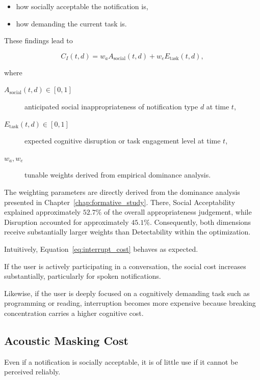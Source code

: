 \begin{itemize}
\item how socially acceptable the notification is,
\item how demanding the current task is.
\end{itemize}

These findings lead to

\begin{equation}
C_I(t,d)
=
w_aA_{\mathrm{social}}(t,d)
+
w_eE_{\mathrm{task}}(t,d),
\label{eq:interrupt_cost}
\end{equation}

where

\begin{description}
\item[{$A_{\mathrm{social}}(t,d) \in [0, 1]$}] anticipated social inappropriateness of notification type $d$ at time $t$,
\item[{$E_{\mathrm{task}}(t,d) \in [0, 1]$}] expected cognitive disruption or task engagement level at time $t$,
\item[$w_a, w_e$] tunable weights derived from empirical dominance analysis.
\end{description}

The weighting parameters are directly derived from the dominance analysis presented in Chapter~\ref{chap:formative_study}. There, Social Acceptability explained approximately $52.7\%$ of the overall appropriateness judgement, while Disruption accounted for approximately $45.1\%$. Consequently, both dimensions receive substantially larger weights than Detectability within the optimization.

Intuitively, Equation~\ref{eq:interrupt_cost} behaves as expected.

If the user is actively participating in a conversation, the social cost increases substantially, particularly for spoken notifications.

Likewise, if the user is deeply focused on a cognitively demanding task such as programming or reading, interruption becomes more expensive because breaking concentration carries a higher cognitive cost.


\subsection{Acoustic Masking Cost}

Even if a notification is socially acceptable, it is of little use if it cannot be perceived reliably.

